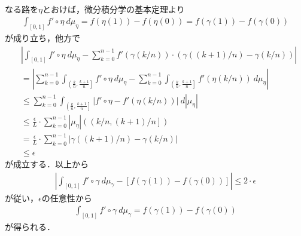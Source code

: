 \begin{sketch}
\begin{align}
		\end{align}
		なる路を$\eta$とおけば，微分積分学の基本定理より
		\begin{align}
			\int_{[0,1]} f' \circ \eta\ d\mu_{\eta} = f(\eta(1)) - f(\eta(0))
			= f(\gamma(1)) - f(\gamma(0))
		\end{align}
		が成り立ち，他方で
		\begin{align}
			&\left|\int_{[0,1]} f' \circ \eta\ d\mu_{\eta}
			- \sum_{k=0}^{n-1} f'(\gamma(k/n)) \cdot \left(\gamma((k+1)/n) - \gamma(k/n)\right)\right| \\
			&= \left|\sum_{k=0}^{n-1} \int_{\left(\frac{k}{n},\frac{k+1}{n}\right]} f' \circ \eta\ d\mu_{\eta}
			- \sum_{k=0}^{n-1} \int_{\left(\frac{k}{n},\frac{k+1}{n}\right]} f'(\eta(k/n))\ d\mu_{\eta}\right| \\
			&\leq \sum_{k=0}^{n-1} \int_{\left(\frac{k}{n},\frac{k+1}{n}\right]}
			\left|f' \circ \eta - f'(\eta(k/n))\right|\ d|\mu_{\eta}| \\
			&\leq \frac{\epsilon}{L} \cdot \sum_{k=0}^{n-1} |\mu_{\eta}|\left(\left(k/n,(k+1)/n\right]\right) \\
			&= \frac{\epsilon}{L} \cdot \sum_{k=0}^{n-1} \left|\gamma((k+1)/n) - \gamma(k/n)\right| \\
			&\leq \epsilon
		\end{align}
		が成立する．以上から
		\begin{align}
			\left|\int_{[0,1]} f'\circ\gamma\ d\mu_{\gamma}
			- \left[f(\gamma(1)) - f(\gamma(0))\right]\right|
			\leq 2 \cdot \epsilon
		\end{align}
		が従い，$\epsilon$の任意性から
		\begin{align}
			\int_{[0,1]} f'\circ\gamma\ d\mu_{\gamma} = f(\gamma(1)) - f(\gamma(0))
		\end{align}
		が得られる．
		\QED
	\end{sketch}